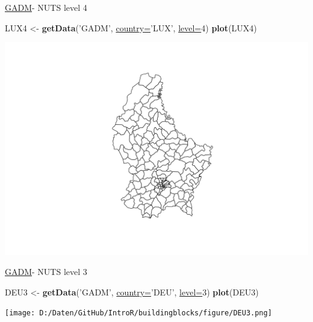 \documentclass[ignorenonframetext,]{beamer}
\newenvironment{Shaded}{\begin{snugshade}}{\end{snugshade}}
\newcommand{\KeywordTok}[1]{\textcolor[rgb]{0.26,0.66,0.93}{\textbf{#1}}}
\newcommand{\DataTypeTok}[1]{\textcolor[rgb]{0.74,0.68,0.62}{\underline{#1}}}
\newcommand{\DecValTok}[1]{\textcolor[rgb]{0.27,0.67,0.26}{#1}}
\newcommand{\StringTok}[1]{\textcolor[rgb]{0.02,0.61,0.04}{#1}}
\newcommand{\NormalTok}[1]{\textcolor[rgb]{0.74,0.68,0.62}{#1}}
\begin{document}
\begin{frame}[fragile]{\href{http://www.gadm.org/}{GADM}- NUTS level 4}

\begin{Shaded}
\begin{Highlighting}[]
\NormalTok{LUX4 <-}\StringTok{ }\KeywordTok{getData}\NormalTok{(}\StringTok{'GADM'}\NormalTok{, }\DataTypeTok{country=}\StringTok{'LUX'}\NormalTok{, }\DataTypeTok{level=}\DecValTok{4}\NormalTok{)}
\KeywordTok{plot}\NormalTok{(LUX4)}
\end{Highlighting}
\end{Shaded}

\includegraphics{Geomedizin_files/figure-beamer/LUX4-1.pdf}

\end{frame}

\begin{frame}[fragile]{\href{http://www.gadm.org/}{GADM}- NUTS level 3}

\begin{Shaded}
\begin{Highlighting}[]
\NormalTok{DEU3 <-}\StringTok{ }\KeywordTok{getData}\NormalTok{(}\StringTok{'GADM'}\NormalTok{, }\DataTypeTok{country=}\StringTok{'DEU'}\NormalTok{, }\DataTypeTok{level=}\DecValTok{3}\NormalTok{)}
\KeywordTok{plot}\NormalTok{(DEU3)}
\end{Highlighting}
\end{Shaded}

\texttt{[image: D:/Daten/GitHub/IntroR/buildingblocks/figure/DEU3.png]}

\end{frame}
\end{document}
